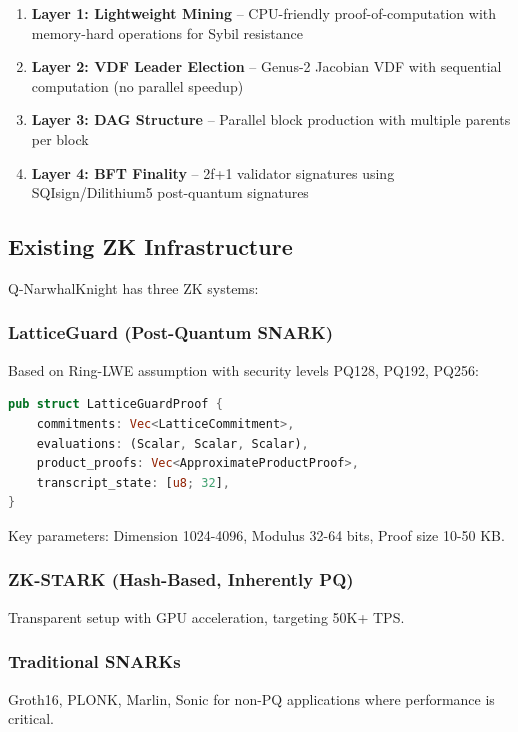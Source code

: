 \documentclass[11pt,a4paper]{article}
\begin{document}
\begin{enumerate}
    \item \textbf{Layer 1: Lightweight Mining} -- CPU-friendly proof-of-computation with memory-hard operations for Sybil resistance
    \item \textbf{Layer 2: VDF Leader Election} -- Genus-2 Jacobian VDF with sequential computation (no parallel speedup)
    \item \textbf{Layer 3: DAG Structure} -- Parallel block production with multiple parents per block
    \item \textbf{Layer 4: BFT Finality} -- 2f+1 validator signatures using SQIsign/Dilithium5 post-quantum signatures
\end{enumerate}

\subsection{Existing ZK Infrastructure}

Q-NarwhalKnight has three ZK systems:

\subsubsection{LatticeGuard (Post-Quantum SNARK)}

Based on Ring-LWE assumption with security levels PQ128, PQ192, PQ256:

\begin{lstlisting}[language=Rust,caption=LatticeGuard proof structure]
pub struct LatticeGuardProof {
    commitments: Vec<LatticeCommitment>,
    evaluations: (Scalar, Scalar, Scalar),
    product_proofs: Vec<ApproximateProductProof>,
    transcript_state: [u8; 32],
}
\end{lstlisting}

Key parameters: Dimension 1024-4096, Modulus 32-64 bits, Proof size 10-50 KB.

\subsubsection{ZK-STARK (Hash-Based, Inherently PQ)}

Transparent setup with GPU acceleration, targeting 50K+ TPS.

\subsubsection{Traditional SNARKs}

Groth16, PLONK, Marlin, Sonic for non-PQ applications where performance is critical.
\end{document}
